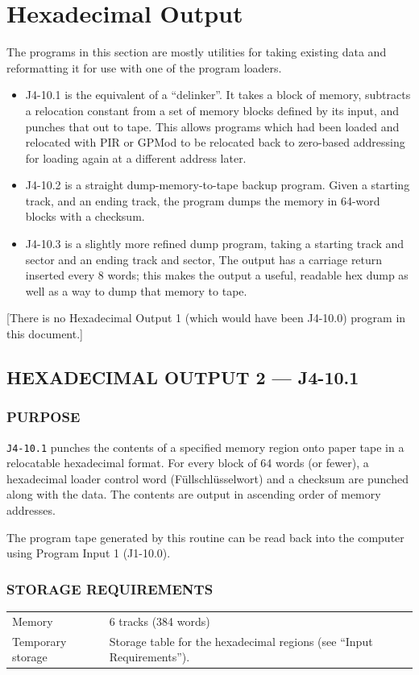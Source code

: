 \section{Hexadecimal Output}
The programs in this section are mostly utilities for taking existing data and reformatting it for use with one of the program loaders.
\begin{itemize}
	\item J4-10.1 is the equivalent of a ``delinker''. It takes a block of memory, subtracts a relocation constant from a set of memory blocks defined by its input, and punches that out to tape. This allows programs which had been loaded and relocated with PIR or GPMod to be relocated back to zero-based addressing for loading again at a different address later.
	\item J4-10.2 is a straight dump-memory-to-tape backup program. Given a starting track, and an ending track, the program dumps the memory in 64-word blocks with a checksum.
	\item J4-10.3 is a slightly more refined dump program, taking a starting track and sector and an ending track and sector, The output has a carriage return inserted every 8 words; this makes the output a useful, readable hex dump as well as a way to dump that memory to tape.
\end{itemize}

[There is no Hexadecimal Output 1 (which would have been J4-10.0) program in this document.]

\subsection*{HEXADECIMAL OUTPUT 2 --- J4-10.1}
\label{sec:hexadecimal-output-2}

\subsubsection*{PURPOSE}
\texttt{J4-10.1} punches the contents of a specified memory region onto paper tape in a relocatable hexadecimal format. For every block of 64 words (or fewer), a hexadecimal loader control word (Füllschlüsselwort) and a checksum are punched along with the data. The contents are output in ascending order of memory addresses.

The program tape generated by this routine can be read back into the computer using Program Input 1 (J1-10.0).

\subsubsection*{STORAGE REQUIREMENTS}
\begin{center}
\begin{tabularx}{\textwidth}{lX}
    \toprule
    Memory & 6 tracks (384 words) \\
    Temporary storage    & Storage table for the hexadecimal regions (see ``Input Requirements''). \\
    \bottomrule
\end{tabularx}
\end{center}

